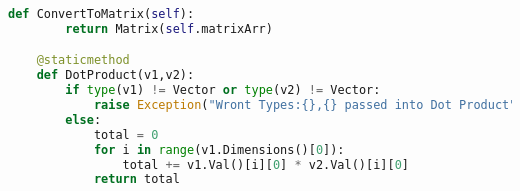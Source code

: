 \begin{flushleft}
\begin{enumerate}
\begin{lstlisting}[language=Python]
    def ConvertToMatrix(self):
        return Matrix(self.matrixArr)

    @staticmethod
    def DotProduct(v1,v2):
        if type(v1) != Vector or type(v2) != Vector:
            raise Exception("Wront Types:{},{} passed into Dot Product".format(type(v1),type(v2)))
        else:
            total = 0
            for i in range(v1.Dimensions()[0]):
                total += v1.Val()[i][0] * v2.Val()[i][0]
            return total
        \end{lstlisting}
    \end{enumerate}
\end{flushleft}